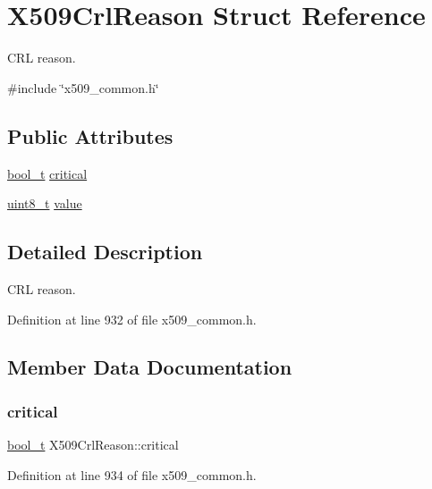 \hypertarget{structX509CrlReason}{}\section{X509\+Crl\+Reason Struct Reference}
\label{structX509CrlReason}


C\+RL reason.  




{\ttfamily \#include \char`\"{}x509\+\_\+common.\+h\char`\"{}}

\subsection*{Public Attributes}
\begin{DoxyCompactItemize}
\item 
\hyperlink{compiler__port_8h_a812d16e5494522586b3784e55d479912}{bool\+\_\+t} \hyperlink{structX509CrlReason_a1b546d87163e9e5e93ac3ccabb3da44e}{critical}
\item 
\hyperlink{stdint_8h_aba7bc1797add20fe3efdf37ced1182c5}{uint8\+\_\+t} \hyperlink{structX509CrlReason_aeb0b8a221c1871f8faab552f92f66cd7}{value}
\end{DoxyCompactItemize}


\subsection{Detailed Description}
C\+RL reason. 

Definition at line 932 of file x509\+\_\+common.\+h.



\subsection{Member Data Documentation}
\mbox{\label{structX509CrlReason_a1b546d87163e9e5e93ac3ccabb3da44e}} 
\subsubsection{\texorpdfstring{critical}{critical}}
{\footnotesize\ttfamily \hyperlink{compiler__port_8h_a812d16e5494522586b3784e55d479912}{bool\+\_\+t} X509\+Crl\+Reason\+::critical}



Definition at line 934 of file x509\+\_\+common.\+h.

